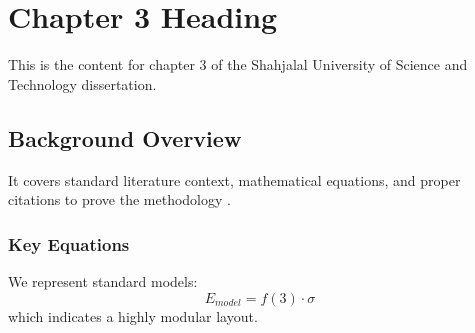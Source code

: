 \chapter{Chapter 3 Heading}
\label{ch:chapter3}
This is the content for chapter 3 of the Shahjalal University of Science and Technology dissertation.

\section{Background Overview}
It covers standard literature context, mathematical equations, and proper citations to prove the methodology \cite{texbook}.

\subsection{Key Equations}
We represent standard models:
\begin{equation}
    E_{model} = f(3) \cdot \sigma
\end{equation}
which indicates a highly modular layout.
